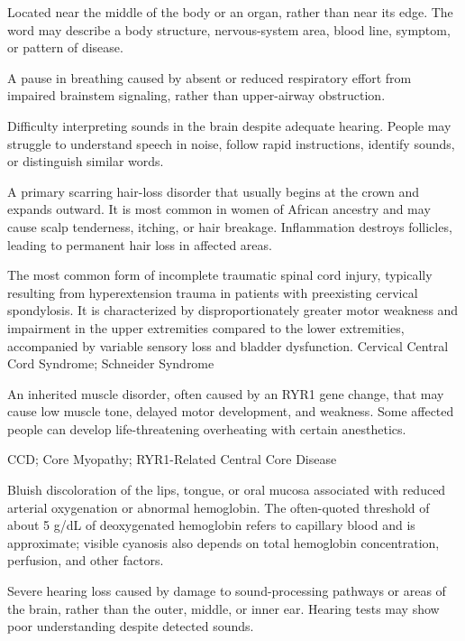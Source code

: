  Located near the middle of the body or an organ, rather than near its edge. The word may describe a body structure, nervous-system area, blood line, symptom, or pattern of disease.

 A pause in breathing caused by absent or reduced respiratory effort from impaired brainstem signaling, rather than upper-airway obstruction.

 Difficulty interpreting sounds in the brain despite adequate hearing. People may struggle to understand speech in noise, follow rapid instructions, identify sounds, or distinguish similar words.

 A primary scarring hair-loss disorder that usually begins at the
crown and expands outward. It is most common in women of African ancestry and may cause
scalp tenderness, itching, or hair breakage. Inflammation destroys follicles, leading to
permanent hair loss in affected areas.

 The most common form of incomplete traumatic spinal cord injury, typically resulting from hyperextension trauma in patients with preexisting cervical spondylosis. It is characterized by disproportionately greater motor weakness and impairment in the upper extremities compared to the lower extremities, accompanied by variable sensory loss and bladder dysfunction.
\synonyms
Cervical Central Cord Syndrome; Schneider Syndrome

 An inherited muscle disorder, often caused by an RYR1 gene change, that may cause low muscle tone, delayed motor development, and weakness. Some affected people can develop life-threatening overheating with certain anesthetics.

\synonyms
CCD; Core Myopathy; RYR1-Related Central Core Disease

 Bluish discoloration of the lips, tongue, or oral
mucosa associated with reduced arterial oxygenation or abnormal hemoglobin.
The often-quoted threshold of about 5 g/dL of deoxygenated hemoglobin refers
to capillary blood and is approximate; visible cyanosis also depends on total
hemoglobin concentration, perfusion, and other factors.

 Severe hearing loss caused by damage to sound-processing pathways or areas of the brain, rather than the outer, middle, or inner ear. Hearing tests may show poor understanding despite detected sounds.

